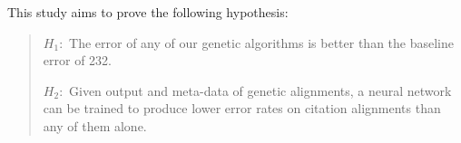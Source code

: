 This study aims to prove the following hypothesis:
	\begin{quote}
		$H_{1}:$ The error of any of our genetic algorithms is better than the baseline error of 232.

		$H_{2}:$ Given output and meta-data of genetic alignments, a neural network can be trained to produce lower error rates on citation alignments than any of them alone.

	\end{quote}

